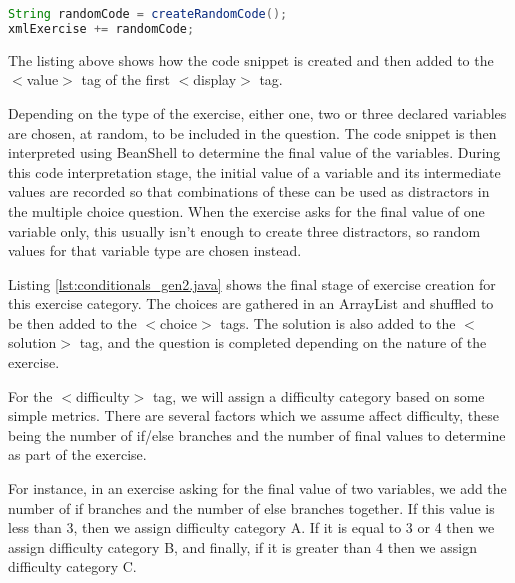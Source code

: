 \begin{lstlisting}[language={Java}]
String randomCode = createRandomCode();
xmlExercise += randomCode;            
\end{lstlisting}

The listing above shows how the code snippet is created and then added to the \textsf{$<$value$>$} tag of the first \textsf{$<$display$>$} tag.\newline

Depending on the type of the exercise, either one, two or three declared variables are chosen, at random, to be included in the question. The code snippet is then interpreted using BeanShell\cite{Beanshell} to determine the final value of the variables. During this code interpretation stage, the initial value of a variable and its intermediate values are recorded so that combinations of these can be used as distractors in the multiple choice question. When the exercise asks for the final value of one variable only, this usually isn't enough to create three distractors, so random values for that variable type are chosen instead.\newline

Listing \ref{lst:conditionals_gen2.java} shows the final stage of exercise creation for this exercise category. The choices are gathered in an \textsf{ArrayList} and shuffled to be then added to the \textsf{$<$choice$>$} tags. The solution is also added to the \textsf{$<$solution$>$} tag, and the question is completed depending on the nature of the exercise.\newpage



For the \textsf{$<$difficulty$>$} tag, we will assign a difficulty category based on some simple metrics. There are several factors which we assume affect difficulty, these being the number of \textsf{if/else} branches and the number of final values to determine as part of the exercise.\newline

For instance, in an exercise asking for the final value of two variables, we add the number of \textsf{if} branches and the number of \textsf{else} branches together. If this value is less than 3, then we assign difficulty category A. If it is equal to 3 or 4 then we assign difficulty category B, and finally, if it is greater than 4 then we assign difficulty category C.\newline

